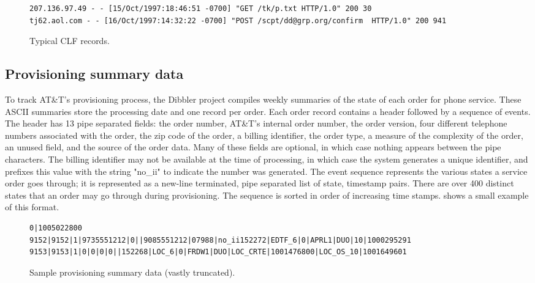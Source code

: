 \documentclass{sig-alternate}
\begin{document}
\begin{figure*}
\begin{small}
\begin{center}
\begin{verbatim}
207.136.97.49 - - [15/Oct/1997:18:46:51 -0700] "GET /tk/p.txt HTTP/1.0" 200 30
tj62.aol.com - - [16/Oct/1997:14:32:22 -0700] "POST /scpt/dd@grp.org/confirm  HTTP/1.0" 200 941
\end{verbatim}
\label{figure:clf-records}
\caption{Typical CLF records.}
\end{center}
\end{small}
\end{figure*}


\subsection{Provisioning summary data}

To track AT\&T's provisioning process, the Dibbler project compiles
weekly summaries of the state of each order for phone service.  
These ASCII summaries store the processing date and one record per order.
Each order record contains a header followed by a sequence of events.
The header has 13 pipe separated fields: the order number, AT\&T's
internal order number, the order version, four different telephone
numbers associated with the order, the zip code of the order, a
billing identifier, the order type, a measure of the complexity of the
order, an unused field, and the source of the order data.  Many of
these fields are optional, in which case nothing appears between the
pipe characters.  The billing identifier may not be available at the
time of processing, in which case the system generates a unique
identifier, and prefixes this value with the string "no\_ii" to
indicate the number was generated. The event sequence represents the
various states a service order goes through; it is represented as a
new-line terminated, pipe separated list of state, timestamp pairs.
There are over 400 distinct states that an order may go through during
provisioning.  The sequence is sorted in order of increasing time
stamps.  shows a small example of
this format.
\begin{figure*}
\begin{small}
\begin{center}
\begin{verbatim}
0|1005022800
9152|9152|1|9735551212|0||9085551212|07988|no_ii152272|EDTF_6|0|APRL1|DUO|10|1000295291
9153|9153|1|0|0|0|0||152268|LOC_6|0|FRDW1|DUO|LOC_CRTE|1001476800|LOC_OS_10|1001649601
\end{verbatim}
\label{figure:dibbler-records}
\caption{Sample provisioning summary data (vastly truncated).}
\end{center}
\end{small}
\end{figure*}
\end{document}
